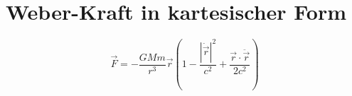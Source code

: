 \section{Weber-Kraft in kartesischer Form}
\[ \vec{F} = -\frac{GMm}{r^3}\vec{r}\left(1 - \frac{|\dot{\vec{r}}|^2}{c^2} + \frac{\vec{r}\cdot\ddot{\vec{r}}}{2c^2}\right) \]